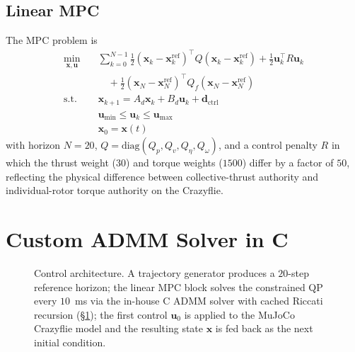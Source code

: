 \documentclass[conference]{IEEEtran}
\begin{document}
\subsection{Linear MPC}

The MPC problem is
\begin{equation}
\begin{aligned}
\min_{\bm{x}, \bm{u}} \quad & \sum_{k=0}^{N-1} \tfrac{1}{2}(\bm{x}_k - \bm{x}_k^\text{ref})^\top Q (\bm{x}_k - \bm{x}_k^\text{ref}) + \tfrac{1}{2}\bm{u}_k^\top R \bm{u}_k \\
& \quad + \tfrac{1}{2}(\bm{x}_N - \bm{x}_N^\text{ref})^\top Q_f (\bm{x}_N - \bm{x}_N^\text{ref}) \\
\text{s.t.} \quad & \bm{x}_{k+1} = A_d \bm{x}_k + B_d \bm{u}_k + \bm{d}_\text{ctrl} \\
& \bm{u}_\text{min} \le \bm{u}_k \le \bm{u}_\text{max} \\
& \bm{x}_0 = \bm{x}(t)
\end{aligned}
\label{eq:mpc}
\end{equation}
with horizon $N = 20$, $Q = \text{diag}(Q_p, Q_v, Q_\eta, Q_\omega)$, and a control penalty $R$ in which the thrust weight ($30$) and torque weights ($1500$) differ by a factor of $50$, reflecting the physical difference between collective-thrust authority and individual-rotor torque authority on the Crazyflie.

\section{Custom ADMM Solver in C}
\label{sec:admm}

\begin{figure}[t]
\centering
{}
\caption{Control architecture. A trajectory generator produces a $20$-step reference horizon; the linear MPC block solves the constrained QP every $10$~ms via the in-house C ADMM solver with cached Riccati recursion (\S\ref{sec:admm}); the first control $\bm{u}_0$ is applied to the MuJoCo Crazyflie model and the resulting state $\bm{x}$ is fed back as the next initial condition.}
\label{fig:architecture}
\end{figure}
\end{document}
